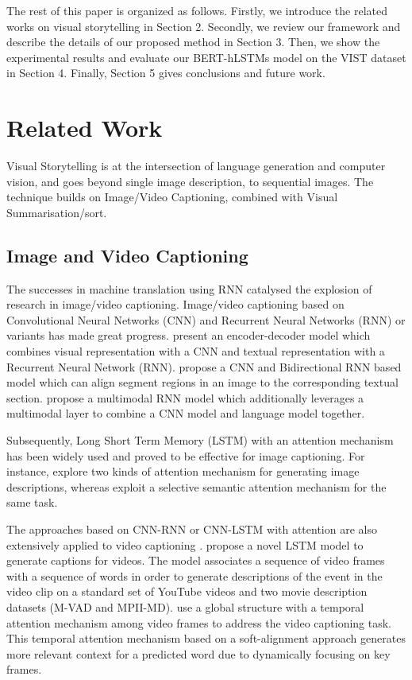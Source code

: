 \documentclass[a4paper,fleqn]{cas-sc}
\begin{document}
The rest of this paper is organized as follows. Firstly, we introduce the related works on visual storytelling in Section 2. Secondly, we review our framework and describe the details of our proposed method in Section 3. Then, we show the experimental results and evaluate our BERT-hLSTMs model on the VIST dataset in Section 4. Finally, Section 5 gives conclusions and future work.

\section{Related Work}
Visual Storytelling is at the intersection of language generation and computer vision, and goes beyond single image description, to sequential images. The technique builds on Image/Video Captioning, combined with Visual Summarisation/sort.

\subsection{Image and Video Captioning}  The successes in machine translation using RNN \citep{ Cho2014Learning, RNN2014,Bahdanau2014Neural} catalysed the explosion of research in image/video captioning. Image/video captioning based on Convolutional Neural Networks (CNN) and Recurrent Neural Networks (RNN) or variants \citep{Vinyals2014Show, Karpathy2015Deep, Donahue2014} has made great progress. \cite{Vinyals2014Show} present an encoder-decoder model which combines visual representation with a CNN \citep{Simonyan2014Very} and textual representation with a Recurrent Neural Network (RNN). \cite{Karpathy2015Deep} propose a CNN and Bidirectional RNN based model which can align segment regions in an image to the corresponding textual section. \cite{Mao2014a} propose a multimodal RNN model which additionally leverages a multimodal layer to combine a CNN model and language model together.

Subsequently, Long Short Term Memory (LSTM) with an attention mechanism \citep{Xu2015Show, Zhu2015Aligning, You2016Image,Lu16,su2018generating,li2019dual} has been widely used and proved to be effective for image captioning. For instance, \cite{Xu2015Show} explore two kinds of attention mechanism for generating image descriptions, whereas \cite{You2016Image} exploit a selective semantic attention mechanism for the same task.

The approaches based on CNN-RNN or CNN-LSTM with attention are also extensively applied to video captioning \citep{Venugopalan2014Translating, Venugopalan2015Sequence, Yao2015Describing}. \cite{Venugopalan2015Sequence} propose a novel LSTM model to generate captions for videos. The model associates a sequence of video frames with a sequence of words in order to generate descriptions of the event in the video clip on a standard set of YouTube videos and two movie description datasets (M-VAD and MPII-MD). \cite{Yao2015Describing} use a global structure with a temporal attention mechanism among video frames to address the video captioning task. This temporal attention mechanism based on a soft-alignment approach generates more relevant context for a predicted word due to dynamically focusing on key frames.
\end{document}
